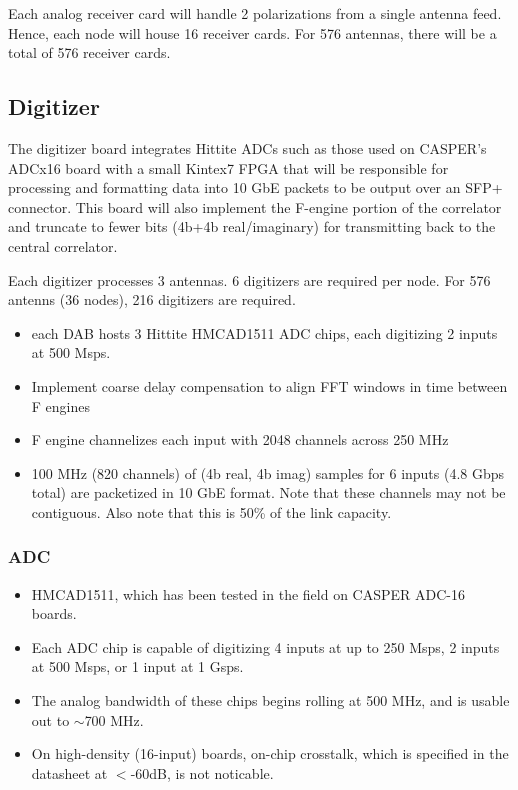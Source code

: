 \documentclass[11pt]{article}
\begin{document}
Each analog receiver card will handle 2 polarizations from a single antenna feed.  Hence, each node will
house 16 receiver cards.  For 576 antennas, there will be a total of 576 receiver cards.

\subsection{Digitizer}

The digitizer board integrates Hittite ADCs
such as those used on CASPER's ADCx16 board with a small Kintex7 FPGA
that will be responsible for processing and formatting data into 10 GbE packets to be output
over an SFP+ connector.  This board will also implement the F-engine portion of the correlator and truncate to fewer bits (4b+4b real/imaginary) for transmitting back to the central correlator.

Each digitizer processes 3 antennas.  6 digitizers are required per node.  For 576 antenns (36 nodes), 216 digitizers
are required.

\begin{itemize}
\item each DAB hosts 3 Hittite HMCAD1511 ADC chips, each digitizing 2 inputs at 500 Msps.
\item Implement coarse delay compensation to align FFT windows in time between F engines
\item F engine channelizes each input with 2048 channels across 250 MHz
\item 100 MHz (820 channels) of (4b real, 4b imag) samples for 6 inputs (4.8 Gbps total) are packetized in
10 GbE format.  Note that these channels may not be contiguous.  Also note that this is 50\% of the link capacity.
\end{itemize}

\subsubsection{ADC}
\begin{itemize}
\item HMCAD1511, which has been tested in the field on CASPER ADC-16 boards.
\item Each ADC chip is capable of digitizing
4 inputs at up to 250 Msps, 2 inputs at 500 Msps, or 1 input at 1 Gsps.  
\item The analog bandwidth of
these chips begins rolling at 500 MHz, and is usable out to $\sim$700 MHz.
\item On high-density (16-input) boards, on-chip crosstalk, which is specified
in the datasheet at $<$-60dB, is not noticable.
\end{itemize}
\end{document}
